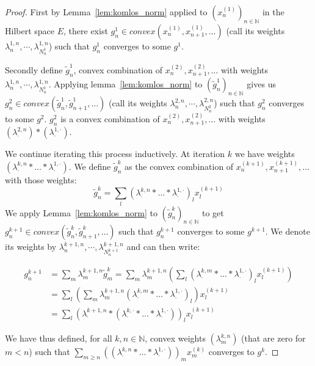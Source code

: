 \begin{proof}
  \leanok
First by Lemma~\ref{lem:komlos_norm} applied to $(x_n^{(1)})_{n\in\mathbb{N}}$ in the Hilbert space $E$, there exist $g_n^1 \in convex(x_n^{(1)}, x_{n+1}^{(1)}, \ldots)$ (call its weights $\lambda^{1,n}_n,\cdots,\lambda^{1,n}_{N^1_n}$) such that $g_n^1$ converges to some $g^1$.

Secondly define $\tilde{g}_n^1$, convex combination of $x_n^{(2)}, x_{n+1}^{(2)}, \ldots$ with weights $\lambda^{1,n}_n,\cdots,\lambda^{1,n}_{N^1_n}$.
Applying lemma~\ref{lem:komlos_norm} to $(\tilde{g}_n^1)_{n\in\mathbb{N}}$ gives us $g_n^2 \in convex(\tilde{g}_n^1, \tilde{g}_{n+1}^1, \ldots)$ (call its weights $\lambda^{2,n}_n,\cdots,\lambda^{2,n}_{N^2_n}$) such that $g_n^2$ converges to some $g^2$.
$g_n^2$ is a convex combination of $x_n^{(2)}, x_{n+1}^{(2)}, \ldots$ with weights $(\lambda^{2,n}_\cdot) * (\lambda^{1,\cdot}_\cdot)$.

We continue iterating this process inductively.
At iteration $k$ we have weights $(\lambda^{k,n}_\cdot * \ldots * \lambda^{1,\cdot}_\cdot)$.
We define $\tilde{g}_n^k$ as the convex combination of $x_n^{(k+1)}, x_{n+1}^{(k+1)}, \ldots$ with those weights:
\[ \tilde{g}_n^k = \sum_{l} (\lambda^{k,n}_\cdot * \ldots * \lambda^{1,\cdot}_\cdot)_l x^{(k+1)}_l \]
We apply Lemma~\ref{lem:komlos_norm} to $(\tilde{g}_n^k)_{n\in\mathbb{N}}$ to get $g_n^{k+1} \in convex(\tilde{g}_n^k, \tilde{g}_{n+1}^k, \ldots)$ such that $g_n^{k+1}$ converges to some $g^{k+1}$. We denote its weights by $\lambda^{k+1,n}_n,\cdots,\lambda^{k+1,n}_{N^{k+1}_n}$ and can then write:

\begin{align*}
  g_n^{k+1} & = \sum_{m} \lambda^{k+1,n}_m \tilde{g}_m^k
  = \sum_{m} \lambda^{k+1,n}_m \left( \sum_{l} (\lambda^{k,m}_\cdot * \ldots * \lambda^{1,\cdot}_\cdot)_l x_l^{(k+1)} \right) \\
  & = \sum_{l} \left( \sum_{m} \lambda^{k+1,n}_m (\lambda^{k,m}_\cdot * \ldots * \lambda^{1,\cdot}_\cdot)_l \right) x_l^{(k+1)} \\
  & = \sum_{l} (\lambda^{k+1,n}_{\cdot} * (\lambda^{k,\cdot}_\cdot * \ldots * \lambda^{1,\cdot}_\cdot))_l x_l^{(k+1)}
\end{align*}

We have thus defined, for all $k, n \in \mathbb{N}$, convex weights $(\lambda^{k,n}_m)$ (that are zero for $m < n$) such that $\sum_{m \ge n}((\lambda^{k,n}_\cdot * \ldots * \lambda^{1, \cdot}_\cdot))_m x_m^{(k)}$ converges to $g^k$.
\end{proof}



